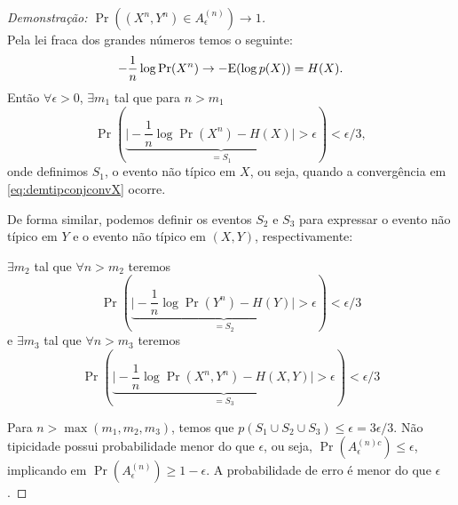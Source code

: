 \begin{proof}[Demonstração: $\Pr \left( (X^n,Y^n) \in A_{\epsilon}^{(n)} \right) \rightarrow 1$]
\ \\
Pela lei fraca dos grandes números temos o seguinte:
\begin{equation}\label{eq:demtipconjconvX}
- \frac{1}{n} \log \Pr (X^n) \rightarrow - \E (\log p(X)) = H(X) .
\end{equation}
Então $\forall \epsilon > 0$, $\exists m_1$ tal que para $n > m_1$
\begin{equation}
\Pr \left( \underbrace{\vert - \frac{1}{n} \log \Pr (X^n) - H(X) \vert > \epsilon }_{=S_1}   \right) < \epsilon/3 ,
\end{equation}
onde definimos $S_1$, o evento não típico em $X$, ou seja, quando a convergência em \ref{eq:demtipconjconvX} ocorre.

De forma similar, podemos definir os eventos $S_2$ e $S_3$ para expressar o evento não típico em $Y$
e o evento não típico em $(X,Y)$, respectivamente:

$\exists m_2$ tal que $\forall n > m_2$ teremos
\begin{equation}
\Pr \left( \underbrace{\vert - \frac{1}{n} \log \Pr (Y^n) - H(Y) \vert > \epsilon }_{=S_2}   \right) < \epsilon/3
\end{equation}
e $\exists m_3$ tal que $\forall n > m_3$ teremos
\begin{equation}
\Pr \left( \underbrace{\vert - \frac{1}{n} \log \Pr (X^n,Y^n) - H(X,Y) \vert > \epsilon }_{=S_3}   \right) < \epsilon/3
\end{equation}

Para $n > \max(m_1, m_2, m_3)$, temos que $p(S_1 \cup S_2 \cup S_3) \leq \epsilon = 3\epsilon/3$.
Não tipicidade possui probabilidade menor do que $\epsilon$, ou seja, $\Pr( A_{\epsilon}^{(n)c} ) \leq \epsilon$,
implicando em $\Pr( A_{\epsilon}^{(n)} ) \geq 1 - \epsilon$.
A probabilidade de erro é menor do que $\epsilon$.
\end{proof}


